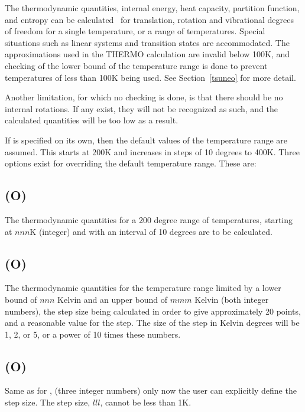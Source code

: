 The  thermodynamic  quantities,  internal  energy,  heat   capacity, partition
function,  and  entropy  can  be  calculated~\cite{thermo}   for translation,
rotation and vibrational degrees of freedom for a single temperature,  or a
range  of temperatures.  Special situations such as linear systems and
transition states are  accommodated.   The  approximations  used  in  the
THERMO  calculation  are  invalid  below  100K, and checking of the lower bound
of the temperature range is done to prevent  temperatures  of  less than 100K
being used. See Section~\ref{tsuneo} for more detail.

Another limitation, for which no checking is  done,  is  that  there should
be  no  internal  rotations.   If  any  exist,  they  will not be recognized as
such, and the calculated quantities will be too  low  as  a result.

If  is specified on its own, then the default  values  of  the
temperature  range  are  assumed.   This  starts at 200K and increases in steps
of 10 degrees to 400K.  Three  options  exist  for  overriding  the default
temperature range.  These are:

\subsection*{ (O)}
The thermodynamic quantities for a 200 degree range of temperatures,
starting at $nnn$K (integer) and with an interval of 10 degrees
are to be calculated.

\subsection*{ (O)}
The thermodynamic quantities for the temperature range limited by  a
lower bound of $nnn$ Kelvin and an upper bound of $mmm$ Kelvin (both integer
numbers), the step size
being calculated  in  order  to  give  approximately  20  points,  and  a
reasonable  value  for  the step.  The size of the step in Kelvin degrees
will be 1, 2, or 5, or a power of 10 times these numbers.

\subsection*{ (O)}
Same as for , (three integer numbers) only now the
user can explicitly define
the step size.  The step size, $lll$, cannot be less than 1K.

